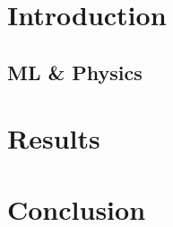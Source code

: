 \documentclass[12pt,a4paper,draft]{book}
\begin{document}
  
  \maketitle
  
  \tableofcontents

  \part{Introduction}
  \chapter{ML \& Physics}
  
  

  \part{Results}
  
  
  

  \part{Conclusion}
  


  \appendix
  
  
  
  
  \cleardoublepage
  \nocite{*}
  \printbibliography
\end{document}
